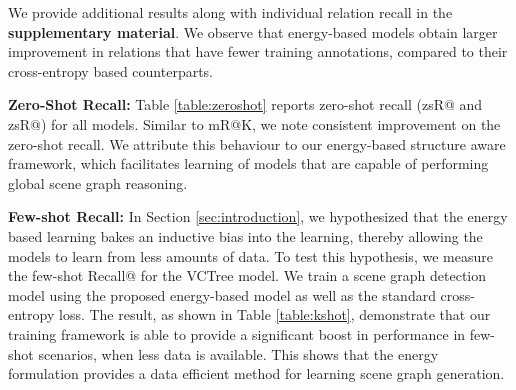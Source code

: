 \documentclass[final]{cvpr}
\begin{document}
We provide additional results along with individual relation recall in the \textbf{supplementary material}. We observe that energy-based models obtain larger improvement in relations that have fewer training annotations, compared to their cross-entropy based counterparts.

\vspace{0.06in}
\noindent
{\bf Zero-Shot Recall:}
Table \ref{table:zeroshot} reports zero-shot recall (zsR@ and zsR@) for all models. Similar to mR@K, we note consistent improvement on the zero-shot recall. We attribute this behaviour to our energy-based structure aware framework, which facilitates learning of models that are capable of performing global scene graph reasoning.

\vspace{0.06in}
\noindent
{\bf Few-shot Recall:}
In Section \ref{sec:introduction}, we hypothesized that the energy based learning bakes an inductive bias into the learning, thereby allowing the models to learn from less amounts of data. To test this hypothesis, we measure the few-shot Recall@ for the VCTree model. We train a scene graph detection model using the proposed energy-based model as well as the standard cross-entropy loss. The result, as shown in Table \ref{table:kshot}, demonstrate that our training framework is able to provide a significant boost in performance in few-shot scenarios, when less data is available. This shows that the energy formulation provides a data efficient method for learning scene graph generation.
\end{document}
